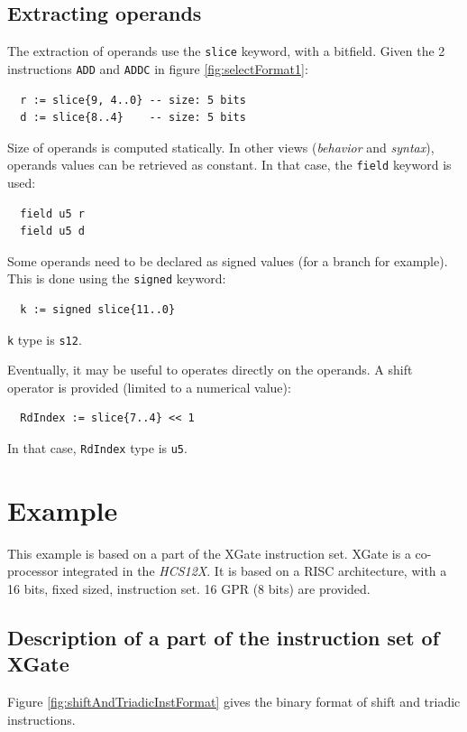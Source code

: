 \subsection{Extracting operands}
\label{sec:operandeFormat}
The extraction of operands use the \texttt{slice} keyword, with a bitfield. Given the 2 instructions \texttt{ADD} and \texttt{ADDC} in figure \ref{fig:selectFormat1}:
\begin{lstlisting}
  r := slice{9, 4..0} -- size: 5 bits
  d := slice{8..4}    -- size: 5 bits
\end{lstlisting}
Size of operands is computed statically. In other views (\emph{behavior} and \emph{syntax}), operands values can be retrieved as constant. In that case, the \texttt{field} keyword is used:
\begin{lstlisting}
  field u5 r
  field u5 d
\end{lstlisting}

Some operands need to be declared as signed values (for a branch for example). This is done using the \texttt{signed} keyword:
\begin{lstlisting}
  k := signed slice{11..0}
\end{lstlisting}
\texttt{k} type is \texttt{s12}.

Eventually, it may be useful to operates directly on the operands. A shift operator is provided (limited to a numerical value):

\begin{lstlisting}
  RdIndex := slice{7..4} << 1
\end{lstlisting}
In that case, \texttt{RdIndex} type is \texttt{u5}.

\section{Example}

This example is based on a part of the XGate instruction set. XGate is a co-processor integrated in the \emph{HCS12X}. It is based on a RISC architecture, with a 16 bits, fixed sized, instruction set. 16 GPR (8 bits) are provided.

\subsection{Description of a part of the instruction set of XGate}
Figure \ref{fig:shiftAndTriadicInstFormat} gives the binary format of shift and triadic instructions.

